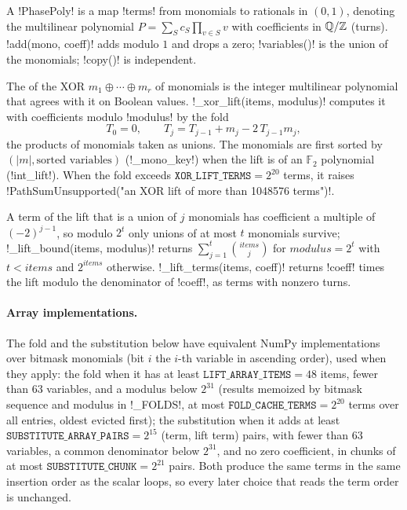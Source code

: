 \begin{definition}\label{def:algebra-phasepoly}
A \py!PhasePoly! is a map \py!terms! from monomials to rationals in $(0,1)$, denoting the multilinear polynomial $P=\sum_S c_S\prod_{v\in S}v$ with coefficients in $\mathbb{Q}/\mathbb{Z}$ (turns). \py!add(mono, coeff)! adds modulo $1$ and drops a zero; \py!variables()! is the union of the monomials; \py!copy()! is independent.
\end{definition}

\begin{definition}\label{def:algebra-xor-lift}
The  of the XOR $m_1\oplus\cdots\oplus m_r$ of monomials is the integer multilinear polynomial that agrees with it on Boolean values. \py!_xor_lift(items, modulus)! computes it with coefficients modulo \code!modulus! by the fold
\begin{equation}
T_0=0,\qquad T_{j}=T_{j-1}+m_j-2\,T_{j-1}m_j,
\end{equation}
the products of monomials taken as unions. The monomials are first sorted by $(|m|,\text{sorted variables})$ (\py!_mono_key!) when the lift is of an $\mathbb{F}_2$ polynomial (\py!int_lift!). When the fold exceeds $\mathtt{XOR\_LIFT\_TERMS}=2^{20}$ terms, it raises \py!PathSumUnsupported("an XOR lift of more than 1048576 terms")!.
\end{definition}

A term of the lift that is a union of $j$ monomials has coefficient a multiple of $(-2)^{j-1}$, so modulo $2^t$ only unions of at most $t$ monomials survive; \py!_lift_bound(items, modulus)! returns $\sum_{j=1}^{t}\binom{\mathit{items}}{j}$ for $\mathit{modulus}=2^t$ with $t<\mathit{items}$ and $2^{\mathit{items}}$ otherwise. \py!_lift_terms(items, coeff)! returns \code!coeff! times the lift modulo the denominator of \code!coeff!, as terms with nonzero turns.

\paragraph{Array implementations.} The fold and the substitution below have equivalent NumPy implementations over bitmask monomials (bit $i$ the $i$-th variable in ascending order), used when they apply: the fold when it has at least $\mathtt{LIFT\_ARRAY\_ITEMS}=48$ items, fewer than $63$ variables, and a modulus below $2^{31}$ (results memoized by bitmask sequence and modulus in \py!_FOLDS!, at most $\mathtt{FOLD\_CACHE\_TERMS}=2^{20}$ terms over all entries, oldest evicted first); the substitution when it adds at least $\mathtt{SUBSTITUTE\_ARRAY\_PAIRS}=2^{15}$ (term, lift term) pairs, with fewer than $63$ variables, a common denominator below $2^{31}$, and no zero coefficient, in chunks of at most $\mathtt{SUBSTITUTE\_CHUNK}=2^{21}$ pairs. Both produce the same terms in the same insertion order as the scalar loops, so every later choice that reads the term order is unchanged.

